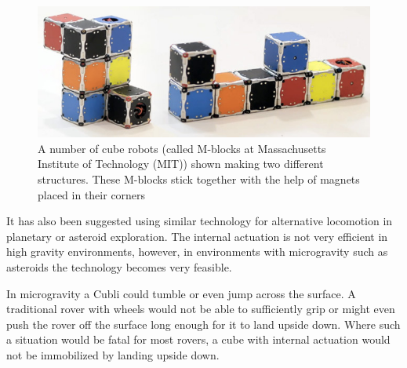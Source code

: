 \begin{figure}[H] 
	\centering
	\includegraphics[scale=0.4]{figures/m-blocks}
	\caption{A number of cube robots (called M-blocks at Massachusetts Institute of Technology (MIT)) shown making two different structures. These M-blocks stick together with the help of magnets placed in their corners \cite{LRosen}}
	\label{MBlocksExample}
\end{figure}
%
It has also been suggested using similar technology for alternative locomotion in planetary or asteroid exploration. The internal actuation is not very efficient in high gravity environments, however, in environments with microgravity such as asteroids the technology becomes very feasible. \cite{RAllen}

In microgravity a Cubli could tumble or even jump across the surface. A traditional rover with wheels would not be able to sufficiently grip or might even push the rover off the surface long enough for it to land upside down. Where such a situation would be fatal for most rovers, a cube with internal actuation would not be immobilized by landing upside down.\cite{ELandau}

